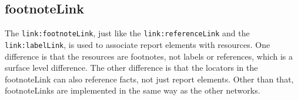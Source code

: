 \subsection{footnoteLink}

The \texttt{link:footnoteLink}, just like the \texttt{link:referenceLink} and the \texttt{link:labelLink}, is used to associate report elements with resources.
One difference is that the resources are footnotes, not labels or references, which is a surface level difference.
The other difference is that the locators in the footnoteLink can also reference facts, not just report elements.
Other than that, footnoteLinks are implemented in the same way as the other networks.